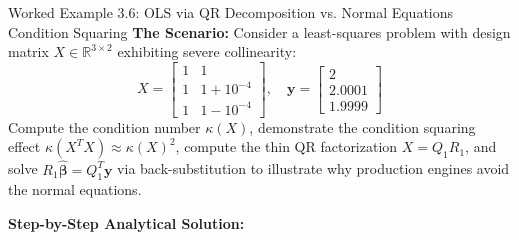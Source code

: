 \begin{examplebox}{Worked Example 3.6: OLS via QR Decomposition vs. Normal Equations Condition Squaring}
\label{ex:w03_qr_vs_normal}
\textbf{The Scenario:}
Consider a least-squares problem with design matrix $X \in \mathbb{R}^{3 \times 2}$ exhibiting severe collinearity:
\begin{equation*}
X = \begin{bmatrix} 1 & 1 \\ 1 & 1 + 10^{-4} \\ 1 & 1 - 10^{-4} \end{bmatrix}, \quad \mathbf{y} = \begin{bmatrix} 2 \\ 2.0001 \\ 1.9999 \end{bmatrix}
\end{equation*}
Compute the condition number $\kappa(X)$, demonstrate the condition squaring effect $\kappa(X^T X) \approx \kappa(X)^2$, compute the thin QR factorization $X = Q_1 R_1$, and solve $R_1 \hat{\boldsymbol{\beta}} = Q_1^T \mathbf{y}$ via back-substitution to illustrate why production engines avoid the normal equations.

\tcblower
\textbf{Step-by-Step Analytical Solution:}


\end{examplebox}
